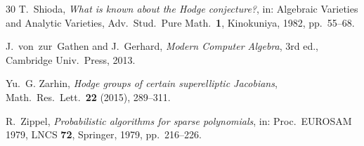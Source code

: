 \documentclass[11pt]{article}
\theoremstyle{plain}
\theoremstyle{definition}
\theoremstyle{remark}
\begin{document}
\begin{thebibliography}{30}
T.~Shioda,
\emph{What is known about the Hodge conjecture?},
in: Algebraic Varieties and Analytic Varieties, Adv.\ Stud.\ Pure Math.\
\textbf{1}, Kinokuniya, 1982, pp.~55--68.

J.~von~zur~Gathen and J.~Gerhard,
\emph{Modern Computer Algebra}, 3rd ed.,
Cambridge Univ.\ Press, 2013.

Yu.~G. Zarhin,
\emph{Hodge groups of certain superelliptic Jacobians},
Math.\ Res.\ Lett.\ \textbf{22} (2015), 289--311.

R.~Zippel,
\emph{Probabilistic algorithms for sparse polynomials},
in: Proc.\ EUROSAM 1979, LNCS \textbf{72}, Springer, 1979, pp.~216--226.

\end{thebibliography}
\end{document}
